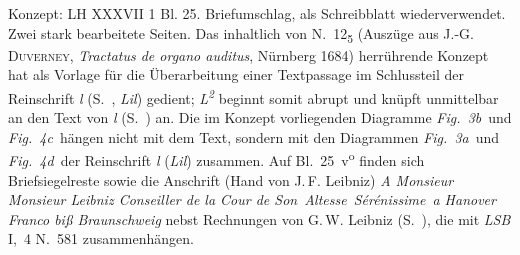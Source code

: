 %
\begin{ledgroupsized}[r]{114mm}
\footnotesize
\pstart \parindent -6mm
%
Konzept: LH XXXVII 1 Bl. 25.
Briefumschlag, als Schreibblatt wiederverwendet.
Zwei stark bearbeitete Seiten.
Das inhalt\-lich von N.~12\textsubscript{5} (Auszüge aus \cite{01203}\textsc{\mbox{J.-G.} Duverney}, \textit{Tractatus de organo auditus}, Nürnberg 1684) herrührende Kon\-zept %
hat als Vorlage für die Überarbeitung einer Textpassage im Schlussteil der Reinschrift \textit{l} (S.~, \textit{Lil}) gedient; %
\textit{L\textsuperscript{2}} beginnt somit abrupt und 
knüpft unmittelbar an den Text von \textit{l} (S.~) an.
Die im Konzept vorliegenden Diagramme \lbrack\textit{Fig.~3b}\rbrack\ und \lbrack\textit{Fig.~4c}\rbrack\ hängen nicht mit dem Text, sondern mit den Diagrammen \lbrack\textit{Fig.~3a}\rbrack\ und \lbrack\textit{Fig.~4d}\rbrack\ der Reinschrift \textit{l} (\textit{Lil}) zusammen. %
Auf Bl.~25~v\textsuperscript{o} finden sich Briefsiegelreste sowie die Anschrift %
(Hand von J.\,F. Leibniz) %
\textit{A Monsieur Monsieur Leibniz Conseiller de la Cour de S}\lbrack\textit{on}\rbrack\ \textit{A}\lbrack\textit{ltesse}\rbrack\ \textit{S}\lbrack\textit{érénissime}\rbrack\ \textit{a Hanover Franco biß Braunschweig} %
nebst Rechnungen von G.\,W. Leibniz (S.~), die mit \textit{LSB} I,~4 N.~581\cite{01322} zusammenhängen.
%
\pend
\end{ledgroupsized}
%
